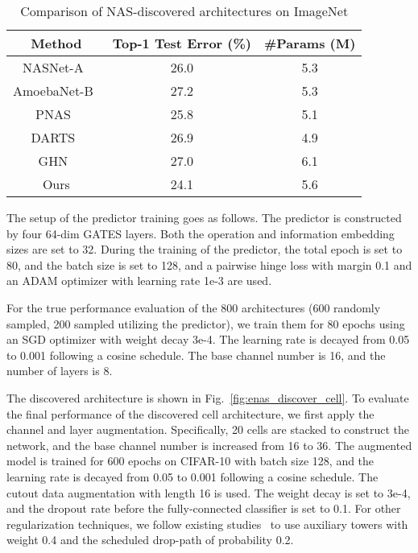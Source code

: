 \documentclass[runningheads]{llncs}
\begin{document}
\begin{table*}[tb]
  \caption{Comparison of NAS-discovered architectures on ImageNet}
  \label{table:imgnet}
  \begin{center}
    \begin{tabular}{ccc}
      \toprule
      Method & Top-1 Test Error (\%) & \#Params (M)\\ \midrule
      NASNet-A~\cite{zoph2016neural}         & 26.0 & 5.3   \\
      AmoebaNet-B~\cite{real2019regularized} & 27.2 & 5.3   \\
      PNAS~\cite{liu2018progressive}                  & 25.8 & 5.1   \\\cmidrule(lr){1-3}
      DARTS~\cite{darts}                       & 26.9 & 4.9   \\
      GHN~\cite{zhang2018graph} & 27.0 & 6.1 \\\hline
      Ours                                   & 24.1 & 5.6 \\ \bottomrule
    \end{tabular}
  \end{center}
\end{table*}

The setup of the predictor training goes as follows. The predictor is constructed by four 64-dim GATES layers. Both the operation and information embedding sizes are set to 32. During the training of the predictor, the total epoch is set to 80, and the batch size is set to 128, and a pairwise hinge loss with margin 0.1 and an ADAM optimizer with learning rate 1e-3 are used.

For the true performance evaluation of the 800 architectures (600 randomly sampled, 200 sampled utilizing the predictor), we train them for 80 epochs using an SGD optimizer with weight decay 3e-4. The learning rate is decayed from 0.05 to 0.001 following a cosine schedule. The base channel number is 16, and the number of layers is 8.

The discovered architecture is shown in Fig.~\ref{fig:enas_discover_cell}. To evaluate the final performance of the discovered cell architecture, we first apply the channel and layer augmentation. Specifically, 20 cells are stacked to construct the network, and the base channel number is increased from 16 to 36. The augmented model is trained for 600 epochs on CIFAR-10 with batch size 128, and the learning rate is decayed from 0.05 to 0.001 following a cosine schedule. The cutout data augmentation with length 16 is used. The weight decay is set to 3e-4, and the dropout rate before the fully-connected classifier is set to 0.1. For other regularization techniques, we follow existing studies~\cite{zoph2018learning,darts} to use auxiliary towers with weight 0.4 and the scheduled drop-path of probability 0.2.
\end{document}
